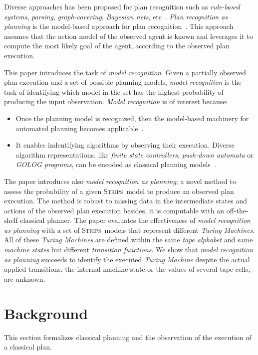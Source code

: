 \documentclass[letterpaper]{article} %
\newcommand{\strips}{\textsc{Strips}}     %
\begin{document}
Diverse approaches has been proposed for plan recognition such as {\em rule-based systems}, {\em parsing}, {\em graph-covering}, {\em Bayesian nets}, etc~\cite{carberry2001techniques}. {\em Plan recognition as planning} is the model-based approach for plan recognition~\cite{ramirez2012plan,ramirez2009plan}. This approach assumes that the action model of the observed agent is known and leverages it to compute the most likely goal of the agent, according to the observed plan execution.

This paper introduces the task of {\em model recognition}.  Given a partially observed plan execution and a set of possible planning models, {\em model recognition} is the task of identifying which model in the set has the highest probability of producing the input observation. {\em Model recognition} is of interest because:
\begin{itemize}
\item Once the planning model is recognized, then the model-based machinery for automated planning becomes applicable~\cite{ghallab2004automated}.
\item It enables indentifying algorithms by observing their execution. Diverse algorithm representations, like {\em finite state controllers}, {\em push-down automata} or {\em {\sc GOLOG} programs}, can be encoded as classical planning models~\cite{baier2007exploiting,Geffner:FSM:AAAI10,segovia2017generating}.
\end{itemize}

The paper introduces also {\em model recognition as planning}; a novel method to assess the probability of a given \strips\ model to produce an observed plan execution. The method is robust to missing data in the intermediate states and actions of the observed plan execution besides, it is computable with an off-the-shelf classical planner. The paper evaluates the effectiveness of {\em model recognition as planning} with a set of \strips\ models that represent different {\em Turing Machines}. All of these {\em Turing Machines} are defined within the same {\em tape alphabet} and same {\em machine states} but different {\em transition functions}. We show that {\em model recognition as planning} succeeds to identify the executed {\em Turing Machine} despite the actual applied transitions, the internal machine state or the values of several tape cells, are unknown.


\section{Background}
\label{sec:background}
This section formalizes classical planning and the observation of the execution of a classical plan.
\end{document}
